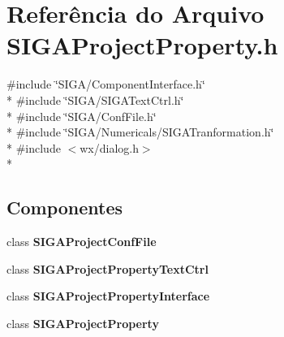 \section{Referência do Arquivo S\+I\+G\+A\+Project\+Property.\+h}
\label{_s_i_g_a_project_property_8h}
{\ttfamily \#include \char`\"{}S\+I\+G\+A/\+Component\+Interface.\+h\char`\"{}}\\*
{\ttfamily \#include \char`\"{}S\+I\+G\+A/\+S\+I\+G\+A\+Text\+Ctrl.\+h\char`\"{}}\\*
{\ttfamily \#include \char`\"{}S\+I\+G\+A/\+Conf\+File.\+h\char`\"{}}\\*
{\ttfamily \#include \char`\"{}S\+I\+G\+A/\+Numericals/\+S\+I\+G\+A\+Tranformation.\+h\char`\"{}}\\*
{\ttfamily \#include $<$wx/dialog.\+h$>$}\\*
\subsection*{Componentes}
\begin{DoxyCompactItemize}
\item 
class {\bf S\+I\+G\+A\+Project\+Conf\+File}
\item 
class {\bf S\+I\+G\+A\+Project\+Property\+Text\+Ctrl}
\item 
class {\bf S\+I\+G\+A\+Project\+Property\+Interface}
\item 
class {\bf S\+I\+G\+A\+Project\+Property}
\end{DoxyCompactItemize}
